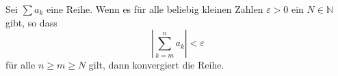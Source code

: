 Sei $\sum a_k$ eine Reihe. Wenn es für alle beliebig kleinen Zahlen $\varepsilon > 0$ ein $N \in \mathbb{N}$ gibt, so dass
$$\left|\sum_{k=m}^na_k\right|<\varepsilon$$
für alle $n \geq m \geq N$ gilt, dann konvergiert die Reihe. 